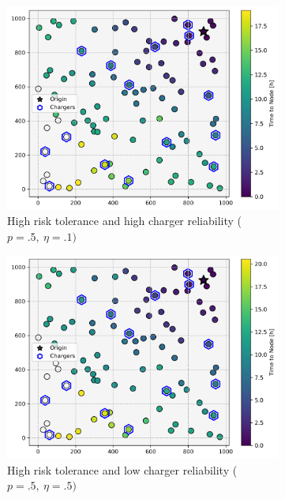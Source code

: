 \documentclass[12pt]{article}
\begin{document}
\begin{figure}[H]
	\centering
	\begin{subfigure}{.5\linewidth}
		\centering\includegraphics[width = \linewidth]{figs/parameter_factorial_00.png}
		\captionsetup{width=.8\linewidth}
		\caption{High risk tolerance and high charger reliability ($p = .5,\ \eta = .1)$}
	\end{subfigure}%
	\begin{subfigure}{.5\linewidth}
		\centering\includegraphics[width = \linewidth]{figs/parameter_factorial_01.png}
		\captionsetup{width=.8\linewidth}
		\caption{High risk tolerance and low charger reliability ($p = .5,\ \eta = .5)$}
	\end{subfigure}
	\begin{subfigure}{.5\linewidth}

\end{subfigure}
\end{figure}
\end{document}
